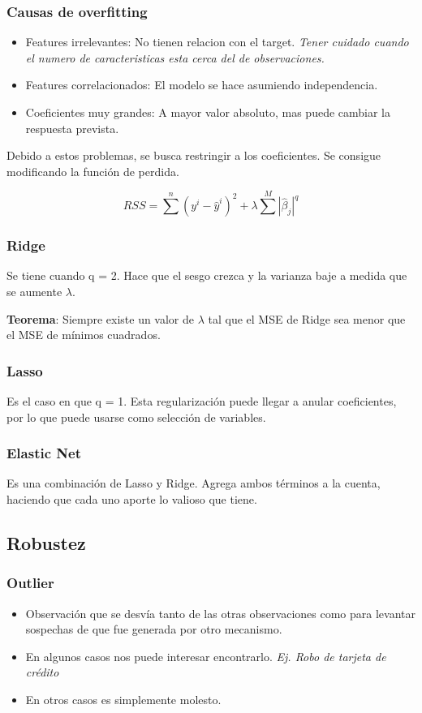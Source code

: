 \documentclass[titlepage,a4paper]{article}
\begin{document}
\subsubsection*{Causas de overfitting}
\begin{itemize}
    \item Features irrelevantes: No tienen relacion con el target. \textit{Tener cuidado cuando el numero de caracteristicas esta cerca del de observaciones.}
    \item Features correlacionados: El modelo se hace asumiendo independencia.
    \item Coeficientes muy grandes: A mayor valor absoluto, mas puede cambiar la respuesta prevista.
\end{itemize}

Debido a estos problemas, se busca restringir a los coeficientes. Se consigue modificando la función de perdida.

\begin{equation}
    RSS = \sum^{n} (y^{i}-\hat{y}^{i})^{2} + \lambda \sum^{M} |\hat{\beta}_j|^{q}
\end{equation}

\subsubsection{Ridge}
Se tiene cuando q = 2. Hace que el sesgo crezca y la varianza baje a medida que se aumente $\lambda$.

\textbf{Teorema}: Siempre existe un valor de $\lambda$ tal que el MSE de Ridge sea menor que el MSE de mínimos cuadrados.

\subsubsection{Lasso}
Es el caso en que q = 1. Esta regularización puede llegar a anular coeficientes, por lo que puede usarse como selección de variables.

\subsubsection{Elastic Net}
Es una combinación de Lasso y Ridge. Agrega ambos términos a la cuenta, haciendo que cada uno aporte lo valioso que tiene.

\subsection{Robustez}
\subsubsection*{Outlier}
\begin{itemize}
    \item Observación que se desvía tanto de las otras observaciones como para levantar sospechas de que fue generada por otro mecanismo.
    \item En algunos casos nos puede interesar encontrarlo. \textit{Ej. Robo de tarjeta de crédito}
    \item En otros casos es simplemente molesto.
\end{itemize}
\end{document}
